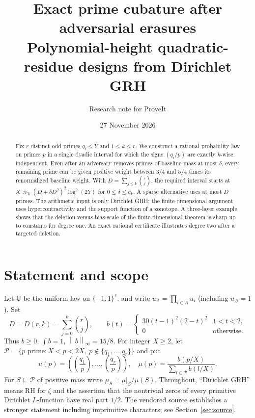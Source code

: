 \documentclass[11pt]{article}
\title{Exact prime cubature after adversarial erasures\\[3pt]\large Polynomial-height quadratic-residue designs from Dirichlet GRH}
\author{Research note for ProveIt}
\date{27 November 2026}
\theoremstyle{remark}\newtheorem{remark}[theorem]{Remark}
\newcommand{\U}{\mathsf U}
\newcommand{\Pp}{\mathcal P}
\newcommand{\leg}[2]{\left(\frac{#1}{#2}\right)}
\newcommand{\norm}[1]{\left\|#1\right\|}
\begin{document}
\maketitle
\begin{abstract}
Fix $r$ distinct odd primes $q_i\le Y$ and $1\le k\le r$. We construct a rational probability law on primes $p$ in a single dyadic interval for which the signs $(q_i/p)$ are exactly $k$-wise independent. Even after an adversary removes primes of baseline mass at most $\delta$, every remaining prime can be given positive weight between $3/4$ and $5/4$ times its renormalized baseline weight. With $D=\sum_{j\le k}\binom rj$, the required interval starts at $X\gg_k(D+\delta D^2)^2\log^2(2Y)$ for $0\le\delta\le c_k$. A sparse alternative uses at most $D$ primes. The arithmetic input is only Dirichlet GRH; the finite-dimensional argument uses hypercontractivity and the support function of a zonotope. A three-layer example shows that the deletion-versus-bias scale of the finite-dimensional theorem is sharp up to constants for degree one. An exact rational certificate illustrates degree two after a targeted deletion.
\end{abstract}

\section{Statement and scope}
Let $\U$ be the uniform law on $\{-1,1\}^r$, and write $u_A=\prod_{i\in A}u_i$ (including $u_\varnothing=1$). Set
\[
 D=D(r,k)=\sum_{j=0}^k\binom rj,\qquad
 b(t)=\begin{cases}30(t-1)^2(2-t)^2&1<t<2,\\0&\text{otherwise}.\end{cases}
\]
Thus $b\ge0$, $\int b=1$, $\norm b_\infty=15/8$. For integer $X\ge2$, let $\Pp=\{p\text{ prime}:X<p<2X,\ p\notin\{q_1,\dots,q_r\}\}$ and put
\[
 u(p)=(\leg{q_1}{p},\ldots,\leg{q_r}{p}),\quad
 \mu(p)=\frac{b(p/X)}{\sum_{l\in\Pp} b(l/X)}.
\]
For $S\subseteq\Pp$ of positive mass write $\mu_S=\mu|_S/\mu(S)$. Throughout, ``Dirichlet GRH'' means RH for $\zeta$ and the assertion that the nontrivial zeros of every primitive Dirichlet $L$-function have real part $1/2$. The vendored source establishes a stronger statement including imprimitive characters; see Section~\ref{sec:source}.
\end{document}
